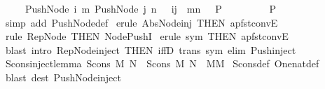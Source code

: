 \begin{isabellebody}
\ \ \ \ {\isachardoublequoteopen}{\isacharbrackleft}{\isacharbar}\ Push{\isacharunderscore}Node\ i\ m\ {\isacharequal}Push{\isacharunderscore}Node\ j\ n{\isacharsemicolon}\ \ {\isacharbrackleft}{\isacharbar}\ i{\isacharequal}j{\isacharsemicolon}\ \ m{\isacharequal}n\ {\isacharbar}{\isacharbrackright}\ {\isacharequal}{\isacharequal}{\isachargreater}\ P\ \ \isanewline
\ \ \ \ \ {\isacharbar}{\isacharbrackright}\ {\isacharequal}{\isacharequal}{\isachargreater}\ P{\isachardoublequoteclose}\isanewline
%
\isadelimproof
%
\endisadelimproof
%
\isatagproof
{}\isamarkupfalse%
\ {\isacharparenleft}simp\ add{\isacharcolon}\ Push{\isacharunderscore}Node{\isacharunderscore}def{\isacharparenright}\isanewline
{}\isamarkupfalse%
\ {\isacharparenleft}erule\ Abs{\isacharunderscore}Node{\isacharunderscore}inj\ {\isacharbrackleft}THEN\ apfst{\isacharunderscore}convE{\isacharbrackright}{\isacharparenright}\isanewline
{}\isamarkupfalse%
\ {\isacharparenleft}rule\ Rep{\isacharunderscore}Node\ {\isacharbrackleft}THEN\ Node{\isacharunderscore}Push{\isacharunderscore}I{\isacharbrackright}{\isacharparenright}{\isacharplus}\isanewline
{}\isamarkupfalse%
\ {\isacharparenleft}erule\ sym\ {\isacharbrackleft}THEN\ apfst{\isacharunderscore}convE{\isacharbrackright}{\isacharparenright}\ \isanewline
{}\isamarkupfalse%
\ {\isacharparenleft}blast\ intro{\isacharcolon}\ Rep{\isacharunderscore}Node{\isacharunderscore}inject\ {\isacharbrackleft}THEN\ iffD{}{\isacharbrackright}\ trans\ sym\ elim{\isacharbang}{\isacharcolon}\ Push{\isacharunderscore}inject{\isacharparenright}\isanewline
{}\isamarkupfalse%
%
\endisatagproof
{\isafoldproof}%
%
\isadelimproof
\isanewline
%
\endisadelimproof
\isanewline
\isanewline
\isanewline
\isanewline
{}\isamarkupfalse%
\ Scons{\isacharunderscore}inject{\isacharunderscore}lemma{}{\isacharcolon}\ {\isachardoublequoteopen}Scons\ M\ N\ {\isacharless}{\isacharequal}\ Scons\ M{\isacharprime}\ N{\isacharprime}\ {\isacharequal}{\isacharequal}{\isachargreater}\ M{\isacharless}{\isacharequal}M{\isacharprime}{\isachardoublequoteclose}\isanewline
%
\isadelimproof
%
\endisadelimproof
%
\isatagproof
{}\isamarkupfalse%
\ Scons{\isacharunderscore}def\ One{\isacharunderscore}nat{\isacharunderscore}def\isanewline
{}\isamarkupfalse%
\ {\isacharparenleft}blast\ dest{\isacharbang}{\isacharcolon}\ Push{\isacharunderscore}Node{\isacharunderscore}inject{\isacharparenright}%
\endisatagproof
{\isafoldproof}%
%
\isadelimproof

\end{isabellebody}
